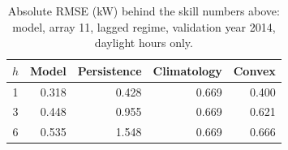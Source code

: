 \begin{table}[t]
  \centering
  \small
  \caption{Absolute RMSE (kW) behind the skill numbers above: model,
  array 11, lagged regime, validation year 2014, daylight hours only.}
  \label{tab:T3}
  \begin{tabular}{c rrrr}
    \toprule
    $h$ & Model & Persistence & Climatology & Convex \\
    \midrule
    1 & 0.318 & 0.428 & 0.669 & 0.400 \\
    3 & 0.448 & 0.955 & 0.669 & 0.621 \\
    6 & 0.535 & 1.548 & 0.669 & 0.666 \\
    \bottomrule
  \end{tabular}
\end{table}
